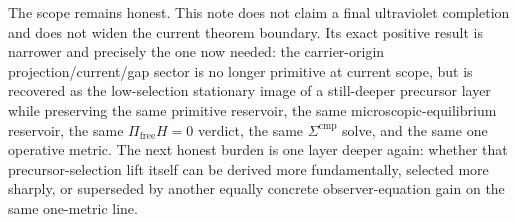 \documentclass[11pt]{article}
\begin{document}
The scope remains honest. This note does not claim a final ultraviolet completion and does not widen the current theorem boundary. Its exact positive result is narrower and precisely the one now needed: the carrier-origin projection/current/gap sector is no longer primitive at current scope, but is recovered as the low-selection stationary image of a still-deeper precursor layer while preserving the same primitive reservoir, the same microscopic-equilibrium reservoir, the same \(\Pi_{\mathrm{free}}H=0\) verdict, the same \(\Sigma^{\mathrm{cmp}}\) solve, and the same one operative metric. The next honest burden is one layer deeper again: whether that precursor-selection lift itself can be derived more fundamentally, selected more sharply, or superseded by another equally concrete observer-equation gain on the same one-metric line.
\end{document}

